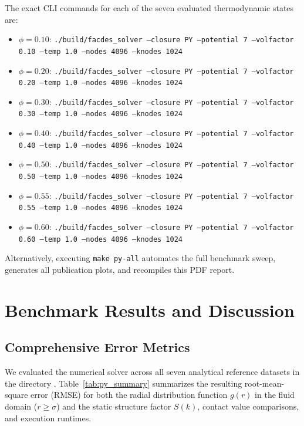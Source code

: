 \documentclass[11pt,a4paper]{article}
\begin{document}
The exact CLI commands for each of the seven evaluated thermodynamic states are:
\begin{itemize}
    \item $\phi = 0.10$: \texttt{./build/facdes\_solver --closure PY --potential 7 --volfactor 0.10 --temp 1.0 --nodes 4096 --knodes 1024}
    \item $\phi = 0.20$: \texttt{./build/facdes\_solver --closure PY --potential 7 --volfactor 0.20 --temp 1.0 --nodes 4096 --knodes 1024}
    \item $\phi = 0.30$: \texttt{./build/facdes\_solver --closure PY --potential 7 --volfactor 0.30 --temp 1.0 --nodes 4096 --knodes 1024}
    \item $\phi = 0.40$: \texttt{./build/facdes\_solver --closure PY --potential 7 --volfactor 0.40 --temp 1.0 --nodes 4096 --knodes 1024}
    \item $\phi = 0.50$: \texttt{./build/facdes\_solver --closure PY --potential 7 --volfactor 0.50 --temp 1.0 --nodes 4096 --knodes 1024}
    \item $\phi = 0.55$: \texttt{./build/facdes\_solver --closure PY --potential 7 --volfactor 0.55 --temp 1.0 --nodes 4096 --knodes 1024}
    \item $\phi = 0.60$: \texttt{./build/facdes\_solver --closure PY --potential 7 --volfactor 0.60 --temp 1.0 --nodes 4096 --knodes 1024}
\end{itemize}
Alternatively, executing \texttt{make py-all} automates the full benchmark sweep, generates all publication plots, and recompiles this PDF report.

\section{Benchmark Results and Discussion}

\subsection{Comprehensive Error Metrics}

We evaluated the numerical solver across all seven analytical reference datasets in the directory . Table~\ref{tab:py_summary} summarizes the resulting root-mean-square error (RMSE) for both the radial distribution function $g(r)$ in the fluid domain ($r \ge \sigma$) and the static structure factor $S(k)$, contact value comparisons, and execution runtimes.


\end{document}
